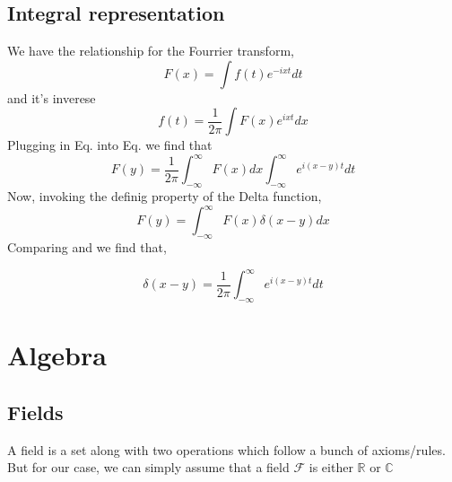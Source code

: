 \subsection{Integral representation}
We have the relationship for the Fourrier transform,
\begin{equation}
F(x) = \int f(t) e^{-ixt} dt
\end{equation}
and it's inverese
\begin{equation}
f(t) = \frac{1}{2 \pi} \int F(x) e^{ixt} dx
\end{equation}
Plugging in Eq. into Eq. we find that 
\begin{equation}
	F(y) = \frac{1}{2 \pi} \int_{-\infty}^{\infty} F(x) dx \int_{-\infty}^{\infty}e^{i(x-y)t} dt
\end{equation}	
Now, invoking the definig property of the Delta function,
\begin{equation}
F(y) = \int_{-\infty}^{\infty} F(x) \delta(x-y) dx
\end{equation}
Comparing and we find that,
\begin{tcolorbox}
\begin{equation}
\delta(x-y) = \frac{1}{2 \pi} \int_{-\infty}^{\infty} e^{i(x-y)t} dt
\end{equation}
\end{tcolorbox}

\section{ Algebra}
\label{ap:algebra}
\subsection{Fields}
A field is a set along with two operations which follow a bunch of axioms/rules. But for our case, we can simply assume that a field $\mathcal{F}$ is either $\mathbb{R}$ or $\mathbb{C}$

